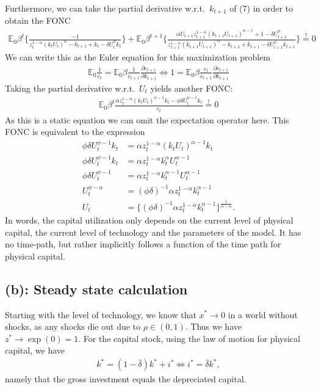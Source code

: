 \documentclass[a4paper]{article}
\theoremstyle{definition}
\begin{document}
Furthermore, we can take the partial derivative w.r.t.\ $k_{t+1}$ of (7) in order to obtain the FONC
	\begin{align*}
	\mathbb E_0 \beta^t \Big\{ \frac{-1}{z_t^{1-\alpha}(k_t U_t)^\alpha - k_{t+1} + k_t - \delta U_t^\phi k_t} \Big\} + \mathbb E_0 \beta^{t+1} \Big\{ \frac{\alpha U_{t+1} z_{t+1}^{1-\alpha}(k_{t+1}U_{t+1})^{\alpha-1} + 1 - \delta U_{t+1}^\phi}{z_{t+1}^{1-\alpha}(k_{t+1}U_{t+1})^\alpha-k_{t+2}+k_{t+1}-\delta U_{t+1}^\phi k_{t+1}} \Big\} \overset{!}{=} 0 
	\end{align*}
We can write this as the Euler equation for this maximization problem
	\begin{align*}
	\mathbb E_0 \frac{1}{c_t} = \mathbb E_0 \beta \frac{1}{c_{t+1}} \frac{\partial c_{t+1}}{\partial k_{t+1}} \Leftrightarrow 1 = \mathbb E_0 \beta \frac{c_{t}}{c_{t+1}} \frac{\partial c_{t+1}}{\partial k_{t+1}}
	\end{align*}
Taking the partial derivative w.r.t.\ $U_t$ yields another FONC:
	\begin{align*}
	\mathbb E_0 \beta^t \frac{\alpha z_t^{1-\alpha}(k_t U_t)^{\alpha-1}k_t- \phi \delta U_t^{\phi-1}k_t}{c_t} \overset{!}{=} 0
	\end{align*}
As this is a static equation we can omit the expectation operator here. This FONC is equivalent to the expression
	\begin{align*}
	\phi \delta U_t^{\phi-1}k_t 	&= \alpha z_t^{1-\alpha}(k_t U_t)^{\alpha-1}k_t \\
	\phi \delta U_t^{\phi-1}k_t 	&= \alpha z_t^{1-\alpha} k_t^{\alpha}U_t^{\alpha-1} \\
	\phi \delta U_t^{\phi-1} 		&= \alpha z_t^{1-\alpha} k_t^{\alpha-1} U_t^{\alpha-1} \\
	U_t^{\phi-\alpha} 				&= (\phi \delta)^{-1}  \alpha z_t^{1-\alpha} k_t^{\alpha-1} \\
	U_t 								&= \Big\{ (\phi \delta)^{-1}  \alpha z_t^{1-\alpha} k_t^{\alpha-1} \Big\}^{\frac{1}{\phi-\alpha}}.
	\end{align*}
In words, the capital utilization only depends on the current level of physical capital, the current level of technology and the parameters of the model. It has no time-path, but rather implicitly follows a function of the time path for physical capital. 	


\subsection{(b): Steady state calculation}
Starting with the level of technology, we know that $x^* \rightarrow 0$ in a world without shocks, as any shocks die out due to $\rho \in (0,1)$. Thus we have $z^* \rightarrow \exp(0) = 1$. For the capital stock, using the law of motion for physical capital, we have
	\begin{align*}
	k^* = (1-\bar \delta)k^* + i^* \Leftrightarrow i^* = \bar\delta k^*,
	\end{align*}
namely that the gross investment equals the depreciated capital.	
\end{document}
